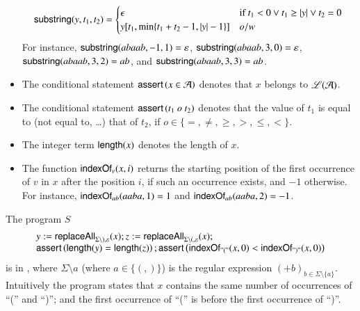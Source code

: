 \begin{itemize}
\[ \mathsf{substring}(y, t_1, t_2)=
\begin{cases}
\epsilon & \mbox{if }t_1<0\vee t_1 \ge |y| \vee t_2=0 \\
y[t_1, \min\{t_1+t_2-1, |y|-1\}] & o/w
\end{cases}
\]
For instance, $\mathsf{substring}(abaab, -1,1)=\varepsilon$, $\mathsf{substring}(abaab, 3,0)=\varepsilon$, $\mathsf{substring}(abaab, 3,2)=ab$, and $\mathsf{substring}(abaab, 3,3)=ab$.
%
\item The conditional statement $\textsf{assert}\left(x \in \mathcal{A}\right)$ denotes that $x$ belongs to $\mathscr{L}(\mathcal{A})$.
%
\item The conditional statement $\textsf{assert}\left(t_1 \ o\ t_2\right)$ denotes that the value of $t_1$ is equal to (not equal to, \dots) that of $t_2$, if $o\in \{ =, \neq, \geq, >, \leq, < \}$.
%
\item The integer term $\mathsf{length}(x)$ denotes the length of $x$. 
%
\item The function $\mathsf{indexOf}_v(x, i)$ returns the starting position of the first occurrence of $v$ in $x$ after the position $i$, if such an occurrence exists, and $-1$ otherwise. For instance, $\mathsf{indexOf}_{ab}(aaba, 1) = 1$ and $\mathsf{indexOf}_{ab}(aaba, 2)=-1$.
\end{itemize}

\begin{example}\label{exmp:running}
The program $S$
\[
\begin{array}{l}
y := \mathsf{replaceAll}_{\Sigma \setminus ), \varepsilon}(x); z:= \mathsf{replaceAll}_{\Sigma \setminus (, \varepsilon}(x);\\
\textsf{assert}\left(\mathsf{length}(y) = \mathsf{length}(z)\right); \textsf{assert}\left(\mathsf{indexOf}_{"("}(x,0) < \mathsf{indexOf}_{")"}(x,0)\right)
\end{array}
\] 
is in {\slint}, where $\Sigma \setminus a$ (where $a \in \{(,)\}$) is the regular expression $(+b)_{b \in \Sigma \setminus \{a\}}$. Intuitively the program states that $x$ contains the same number of occurrences of ``('' and ``)''; and the first occurrence of ``('' is before the first occurrence of ``)''.
\end{example}


